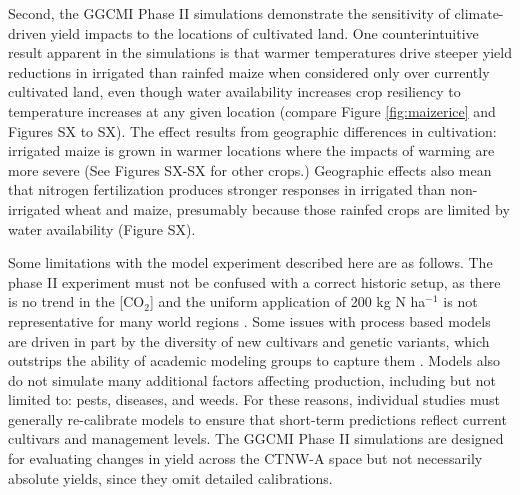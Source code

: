 \documentclass[gmd, manuscript]{copernicus} %
\begin{document}
Second, the GGCMI Phase II simulations demonstrate the sensitivity of climate-driven yield impacts to the locations of cultivated land. 
One counterintuitive result apparent in the simulations is that warmer temperatures drive steeper yield reductions in irrigated than rainfed maize when considered only over currently cultivated land, even though water availability increases crop resiliency to temperature increases at any given location (compare Figure \ref{fig:maizerice} and Figures SX to SX). 
The effect results from geographic differences in cultivation: irrigated maize is grown in warmer locations where the impacts of warming are more severe (See Figures SX-SX for other crops.) 
Geographic effects also mean that nitrogen fertilization produces stronger responses in irrigated than non-irrigated wheat and maize, presumably because those rainfed crops are limited by water availability (Figure SX).

Some limitations with the model experiment described here are as follows.
The phase II experiment must not be confused with a correct historic setup, as there is no trend in the [CO$_2$] and the uniform application of 200 kg N ha$^{-1}$ is not representative for many world regions \citep{Elliott2015}.
Some issues with process based models are driven in part by the diversity of new cultivars and genetic variants, which outstrips the ability of academic modeling groups to capture them \citep[e.g.][]{JONES2017b}. 
Models also do not simulate many additional factors affecting production, including but not limited to: pests, diseases, and weeds. 
For these reasons, individual studies must generally re-calibrate models to ensure that short-term predictions reflect current cultivars and management levels. 
The GGCMI Phase II simulations are designed for evaluating changes in yield across the CTNW-A space but not necessarily absolute yields, since they omit detailed calibrations. 


\end{document}
